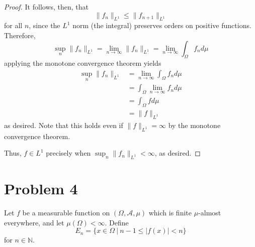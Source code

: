 \documentclass[fontsize=11pt]{scrartcl} %
\numberwithin{equation}{section} %
\numberwithin{figure}{section} %
\numberwithin{table}{section} %
\newcommand{\N}{\mathbb{N}}
\begin{document}
\begin{proof}
    It follows, then, that
    \[
        \|f_n\|_{L^1}\leq\|f_{n+1}\|_{L^1}
    \]
    for all $n$, since the $L^1$ norm (the integral) preserves orders on
    positive functions. Therefore,
    \[
        \sup_n\|f_n\|_{L^1} = \lim_{n\to\infty}\|f_n\|_{L^1}
        =\lim_{n\to\infty}\int_{\Omega}f_nd\mu
    \]
    applying the monotone convergence theorem yields
    \[
        \begin{aligned}
            \sup_n\|f_n\|_{L^1} &= \lim_{n\to\infty}\int_{\Omega}f_nd\mu\\
                                &=\int_{\Omega}\lim_{n\to\infty}f_nd\mu\\
                                &=\int_{\Omega}fd\mu\\
                                &=\|f\|_{L^1}
        \end{aligned}
    \]
    as desired. Note that this holds even if $\|f\|_{L^1} = \infty$ by the
    monotone convergence theorem.

    Thus, $f\in L^1$ precisely when $\sup_n\|f_n\|_{L^1}<\infty$, as desired.
\end{proof}

\newpage

\section*{Problem 4}
Let $f$ be a measurable function on $(\Omega,\mathscr{A},\mu)$ which is finite
$\mu$-almost everywhere, and let $\mu(\Omega)<\infty$. Define
\[
    E_n = \{x\in\Omega\ |\ n-1\leq |f(x)|< n\}
\]
for $n\in\N$.
\end{document}
